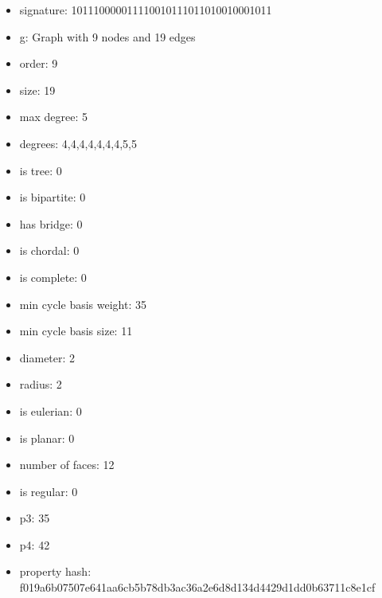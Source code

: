 \newpage
\begin{figure}
\end{figure}
\begin{itemize}
\item signature: 101110000011110010111011010010001011
\item g: Graph with 9 nodes and 19 edges
\item order: 9
\item size: 19
\item max degree: 5
\item degrees: 4,4,4,4,4,4,4,5,5
\item is tree: 0
\item is bipartite: 0
\item has bridge: 0
\item is chordal: 0
\item is complete: 0
\item min cycle basis weight: 35
\item min cycle basis size: 11
\item diameter: 2
\item radius: 2
\item is eulerian: 0
\item is planar: 0
\item number of faces: 12
\item is regular: 0
\item p3: 35
\item p4: 42
\item property hash: f019a6b07507e641aa6cb5b78db3ac36a2e6d8d134d4429d1dd0b63711c8e1cf
\end{itemize}
